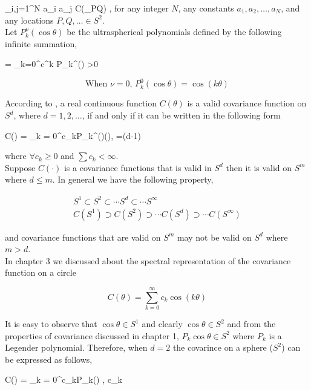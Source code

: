 \beq
\sum_{i,j=1}^{N} a_i a_j C(\theta_{PQ}) ,
\eeq
for any integer $N$, any constants $a_1, a_2, \ldots, a_N$, and any locations $P, Q, \ldots \in S^2$.\\

Let $P_{k}^{\nu}(\cos\theta)$ be the ultraspherical polynomials defined by the following infinite summation,

\beq
   = \sum_{k=0}^{\infty}c^{k} P_{k}^{\nu}(\cos\theta) \quad \nu>0
\eeq


\[
\mbox{When $\nu = 0$, } P_{k}^{0}(\cos\theta) = \cos (k\theta)
\]

According to \cite{schoenberg1942}, a real continuous function $C(\theta)$ is a valid covariance function on $S^d$, where $d=1,2,\ldots$, if and only if it can be written in the following form

\beq
C(\theta) = \sum_{k = 0}^\infty c_kP_k^{(\nu)}(\cos\theta), \quad \nu=(d-1)
\eeq

where $\forall c_k\ge 0$ and $\sum c_k < \infty$. \\

Suppose $C(\cdot)$ is a covariance functions that is valid in $S^d$ then it is valid on $S^m$ where $d\le m$. In general we have the following property,

\begin{eqnarray*}
S^1 \subset S^2 \subset \cdots S^{d} \subset \cdots S^{\infty} \\
C(S^1) \supset C(S^2) \supset \cdots C(S^d) \supset \cdots C(S^{\infty})
\end{eqnarray*}

and covariance functions that are valid on $S^m$ may not be valid on $S^d$ where $m>d$. \\

In chapter 3 we discussed about the spectral representation of the covariance function on a circle 

\[
C(\theta) = \sum_{k = 0}^\infty c_k\cos (k\theta)
\]

It is easy to observe that $\cos\theta \in S^1$ and clearly $\cos\theta \in S^2$ and from the properties of covariance discussed in chapter 1, $P_k\cos\theta \in S^2$ where $P_k$ is a Legender polynomial. Therefore, when $d=2$ the covarince on a sphere ($S^2$) can be expressed as follows,

\beq \label{covs2_sum}
C(\theta) = \sum_{k = 0}^\infty c_kP_k(\cos\theta) \quad , c_k 
\eeq

